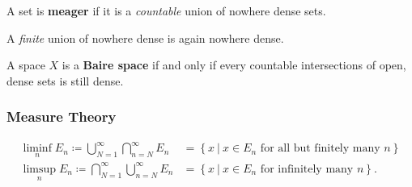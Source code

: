 \begin{definition}

A set is \textbf{meager} if it is a \emph{countable} union of nowhere
dense sets.

\end{definition}

\begin{proposition}

A \emph{finite} union of nowhere dense is again nowhere dense.

\end{proposition}

\begin{definition}

A space \(X\) is a \textbf{Baire space} if and only if every countable
intersections of open, dense sets is still dense.

\end{definition}

\hypertarget{measure-theory}{%
\subsubsection{Measure Theory}\label{measure-theory}}

\begin{definition}

\begin{align*}
\liminf_{n} E_{n} \coloneqq\displaystyle\bigcup_{N=1}^\infty \displaystyle\bigcap_{n=N}^\infty E_{n} &= \left\{{x {~\mathrel{\Big|}~}x\in E_{n} \text{ for all but finitely many } n}\right\}  \\
\limsup_{n} E_{n} \coloneqq\displaystyle\bigcap_{N=1}^\infty \displaystyle\bigcup_{n=N}^{\infty} E_{n} &= \left\{{x {~\mathrel{\Big|}~}x\in E_{n} \text{ for infinitely many } n}\right\} 
.\end{align*}

\end{definition}

